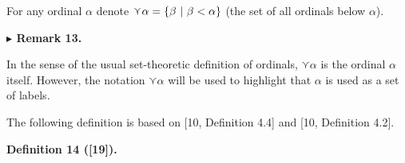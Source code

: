 \documentclass[10pt,a4paper]{amsart}
\begin{document}
For any ordinal $\alpha$ denote $\curlyvee\alpha=\{\beta\leavevmode\nobreak\ |\leavevmode\nobreak\ \beta<\alpha\}$ (the set of all ordinals below $\alpha$).\par
 
 
 
\par\medskip\noindent\textbf{$\blacktriangleright$ Remark 13.}\par
 
 
In the sense of the usual set-theoretic definition of ordinals, $\curlyvee\alpha$ is the ordinal $\alpha$ itself. However, the notation $\curlyvee\alpha$ will be used to highlight that $\alpha$ is used as a set of labels.\par
 
 
 
 
The following definition is based on [10, Definition 4.4] and [10, Definition 4.2].\par
 
 
 
\par\medskip\noindent\textbf{Definition 14 ([19]).}\par
 
 
\end{document}

